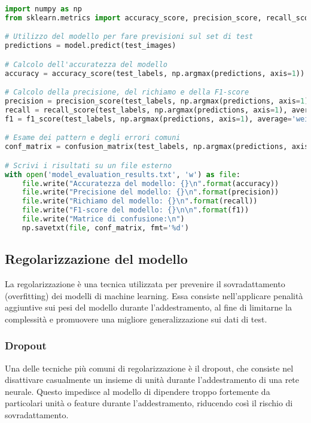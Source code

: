 \documentclass{article}
\begin{document}
\begin{lstlisting}[language=Python, caption={Valutazione delle prestazioni del modello}]
import numpy as np
from sklearn.metrics import accuracy_score, precision_score, recall_score, f1_score, confusion_matrix

# Utilizzo del modello per fare previsioni sul set di test
predictions = model.predict(test_images)

# Calcolo dell'accuratezza del modello
accuracy = accuracy_score(test_labels, np.argmax(predictions, axis=1))

# Calcolo della precisione, del richiamo e della F1-score
precision = precision_score(test_labels, np.argmax(predictions, axis=1), average='weighted')
recall = recall_score(test_labels, np.argmax(predictions, axis=1), average='weighted')
f1 = f1_score(test_labels, np.argmax(predictions, axis=1), average='weighted')

# Esame dei pattern e degli errori comuni
conf_matrix = confusion_matrix(test_labels, np.argmax(predictions, axis=1))

# Scrivi i risultati su un file esterno
with open('model_evaluation_results.txt', 'w') as file:
    file.write("Accuratezza del modello: {}\n".format(accuracy))
    file.write("Precisione del modello: {}\n".format(precision))
    file.write("Richiamo del modello: {}\n".format(recall))
    file.write("F1-score del modello: {}\n\n".format(f1))
    file.write("Matrice di confusione:\n")
    np.savetxt(file, conf_matrix, fmt='%d')
\end{lstlisting}

\subsection{Regolarizzazione del modello}

La regolarizzazione è una tecnica utilizzata per prevenire il sovradattamento (overfitting) dei modelli di machine learning. Essa consiste nell'applicare penalità aggiuntive sui pesi del modello durante l'addestramento, al fine di limitarne la complessità e promuovere una migliore generalizzazione sui dati di test.

\subsubsection{Dropout}

Una delle tecniche più comuni di regolarizzazione è il dropout, che consiste nel disattivare casualmente un insieme di unità durante l'addestramento di una rete neurale. Questo impedisce al modello di dipendere troppo fortemente da particolari unità o feature durante l'addestramento, riducendo così il rischio di sovradattamento.
\end{document}

